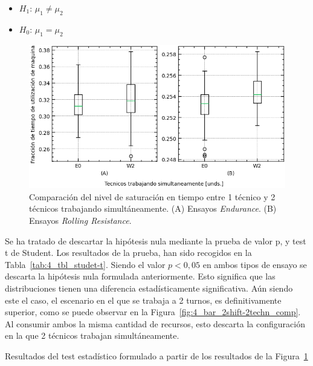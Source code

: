 \begin{itemize}
	\item $H_1$: $\mu_1 \neq \mu_2$
	\item $H_0$: $\mu_1 = \mu_2$
\end{itemize}

\begin{figure}
	\begin{center}
		\includegraphics[width=\textwidth]{fig/4_box_techn1-2_comp}
	\end{center}
	\caption{Comparación del nivel de saturación en tiempo entre 1 técnico y 2 técnicos trabajando simultáneamente.
	(A) Ensayos \textit{Endurance}. (B) Ensayos \textit{Rolling Resistance}.}
	\label{fig:4_box_techn1-2_comp}
\end{figure}

Se ha tratado de descartar la hipótesis nula mediante la prueba de valor p,
y test t de Student.
Los resultados de la prueba,
han sido recogidos en la Tabla~\ref{tab:4_tbl_studet-t}.
Siendo el valor $p < 0,05$ en ambos tipos de ensayo
se descarta la hipótesis nula formulada anteriormente.
Esto significa que las distribuciones
tienen una diferencia estadísticamente significativa.
Aún siendo este el caso,
el escenario en el que se trabaja a 2 turnos,
es definitivamente superior,
como se puede observar en la Figura~\ref{fig:4_bar_2shift-2techn_comp}.
Al consumir ambos la misma cantidad de recursos,
esto descarta la configuración en la que 2 técnicos trabajan simultáneamente.

\begin{table}
	\centering
	\caption{Resultados del test estadístico formulado a partir de los resultados de la Figura~\ref{fig:4_box_techn1-2_comp}}
	
	\label{tab:4_tbl_studet-t}
\end{table}

